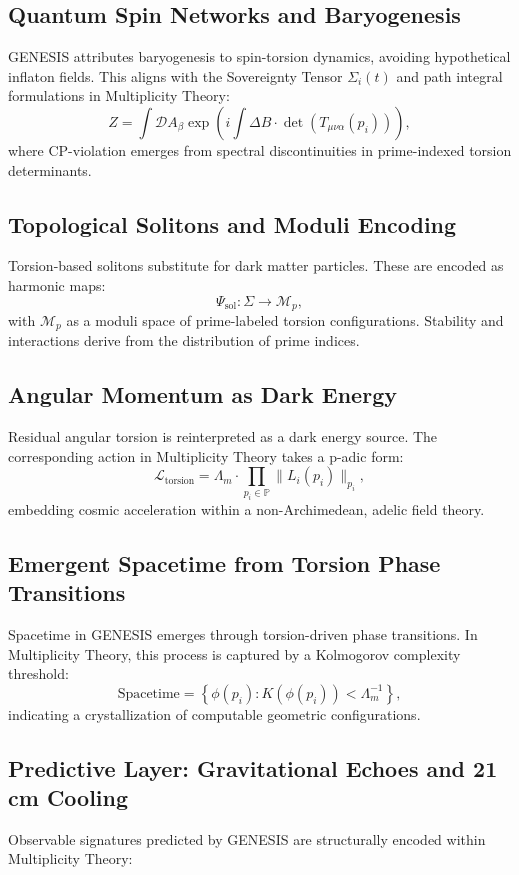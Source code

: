 \documentclass{article}
\theoremstyle{plain}
\begin{document}
\subsection{Quantum Spin Networks and Baryogenesis}
GENESIS attributes baryogenesis to spin-torsion dynamics, avoiding hypothetical inflaton fields. This aligns with the Sovereignty Tensor \( \Sigma_i(t) \) and path integral formulations in Multiplicity Theory:
\[
Z = \int \mathcal{D}A_\beta \exp\left(i \int \Delta B \cdot \det(T_{\mu\nu\alpha}(p_i))\right),
\]
where CP-violation emerges from spectral discontinuities in prime-indexed torsion determinants.

\subsection{Topological Solitons and Moduli Encoding}
Torsion-based solitons substitute for dark matter particles. These are encoded as harmonic maps:
\[
\Psi_{\text{sol}}: \Sigma \rightarrow \mathcal{M}_p,
\]
with \( \mathcal{M}_p \) as a moduli space of prime-labeled torsion configurations. Stability and interactions derive from the distribution of prime indices.

\subsection{Angular Momentum as Dark Energy}
Residual angular torsion is reinterpreted as a dark energy source. The corresponding action in Multiplicity Theory takes a p-adic form:
\[
\mathcal{L}_{\text{torsion}} = \Lambda_m \cdot \prod_{p_i \in \mathbb{P}} \|L_i(p_i)\|_{p_i},
\]
embedding cosmic acceleration within a non-Archimedean, adelic field theory.

\subsection{Emergent Spacetime from Torsion Phase Transitions}
Spacetime in GENESIS emerges through torsion-driven phase transitions. In Multiplicity Theory, this process is captured by a Kolmogorov complexity threshold:
\[
\text{Spacetime} = \left\{ \phi(p_i) : K(\phi(p_i)) < \Lambda_m^{-1} \right\},
\]
indicating a crystallization of computable geometric configurations.

\subsection{Predictive Layer: Gravitational Echoes and 21\,cm Cooling}
Observable signatures predicted by GENESIS are structurally encoded within Multiplicity Theory:
\end{document}
